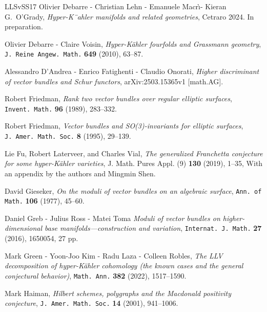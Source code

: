 \documentclass[11pt]{amsart}
\theoremstyle{definition}
\theoremstyle{remark}
\begin{document}
\begin{thebibliography}{LLSvSS17}
 Olivier Debarre - Christian Lehn - Emanuele Macr\`\i - Kieran G.~O'Grady, 
\emph{Hyper-K¨ahler manifolds and
related geometries\/}, Cetraro 2024. In preparation.


 Olivier Debarre - Claire Voisin, \emph{Hyper-K\"ahler fourfolds and
  Grassmann geometry\/},
 {\tt J.~Reine Angew.~Math.} {\bf  649} (2010), 63--87.


 Alessandro  D'Andrea - Enrico Fatighenti - Claudio Onorati, 
\emph{Higher discriminant of vector bundles and Schur functors\/},
arXiv:2503.15365v1 [math.AG].




 Robert Friedman, 
\emph{Rank two vector bundles over regular elliptic surfaces\/},
 {\tt  Invent.~Math.} {\bf 96} (1989),  283--332.
 
 
Robert Friedman, \emph{Vector bundles and SO(3)-invariants for elliptic surfaces\/},
{\tt J.~Amer.~Math.~Soc.} {\bf  8} (1995),  29--139.

Lie Fu, Robert Laterveer, and Charles Vial, \emph{The generalized {F}ranchetta
  conjecture for some hyper-{K}\"{a}hler varieties}, J. Math. Pures Appl. (9)
  \textbf{130} (2019), 1--35, With an appendix by the authors and Mingmin Shen.

 David Gieseker, 
\emph{On the moduli of vector bundles on an algebraic surface\/}, 
{\tt Ann.~of Math.} {\bf  106} (1977), 45--60.


 Daniel Greb - Julius Ross - Matei Toma
\emph{Moduli of vector bundles on higher-dimensional base manifolds—construction and variation\/}, 
{\tt Internat.~J.~Math.} {\bf  27} (2016),  1650054, 27 pp.

 Mark Green - Yoon-Joo Kim - Radu Laza - Colleen Robles,
\emph{The LLV decomposition of hyper-K\"ahler cohomology (the known cases and the general conjectural behavior)\/}, 
{\tt Math.~Ann.} {\bf   382} (2022), 1517--1590.


 Mark Haiman, 
\emph{Hilbert schemes, polygraphs and the Macdonald positivity conjecture\/}, 
{\tt J.~Amer.~Math.~Soc.} {\bf   14} (2001), 941--1006.


\end{thebibliography}
\end{document}
